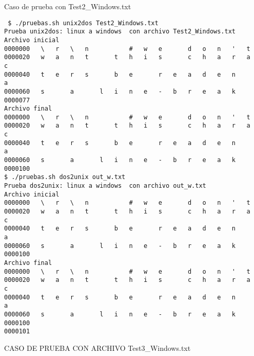 \documentclass[titlepage,a4paper]{article}
\begin{document}
Caso de prueba con Test2_Windows.txt
\begin{lstlisting}
 $ ./pruebas.sh unix2dos Test2_Windows.txt 
Prueba unix2dos: linux a windows  con archivo Test2_Windows.txt
Archivo inicial
0000000   \   r   \   n           #   w   e       d   o   n   '   t    
0000020   w   a   n   t       t   h   i   s       c   h   a   r   a   c
0000040   t   e   r   s       b   e       r   e   a   d   e   n       a
0000060   s       a       l   i   n   e   -   b   r   e   a   k    
0000077
Archivo final
0000000   \   r   \   n           #   w   e       d   o   n   '   t    
0000020   w   a   n   t       t   h   i   s       c   h   a   r   a   c
0000040   t   e   r   s       b   e       r   e   a   d   e   n       a
0000060   s       a       l   i   n   e   -   b   r   e   a   k        
0000100
$ ./pruebas.sh dos2unix out_w.txt 
Prueba dos2unix: linux a windows  con archivo out_w.txt
Archivo inicial
0000000   \   r   \   n           #   w   e       d   o   n   '   t    
0000020   w   a   n   t       t   h   i   s       c   h   a   r   a   c
0000040   t   e   r   s       b   e       r   e   a   d   e   n       a
0000060   s       a       l   i   n   e   -   b   r   e   a   k        
0000100
Archivo final
0000000   \   r   \   n           #   w   e       d   o   n   '   t    
0000020   w   a   n   t       t   h   i   s       c   h   a   r   a   c
0000040   t   e   r   s       b   e       r   e   a   d   e   n       a
0000060   s       a       l   i   n   e   -   b   r   e   a   k        
0000100    
0000101

\end{lstlisting}
CASO DE PRUEBA CON ARCHIVO Test3_Windows.txt 
\end{document}
